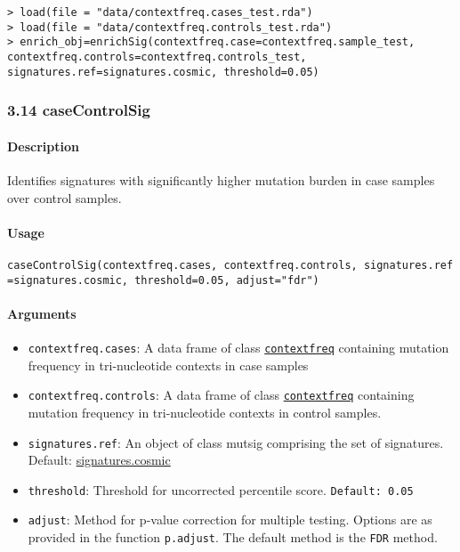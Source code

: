 \documentclass[]{article}
\providecommand{\tightlist}{%
  \setlength{\itemsep}{0pt}\setlength{\parskip}{0pt}}
\let\oldparagraph\paragraph
\renewcommand{\paragraph}[1]{\oldparagraph{#1}\mbox{}}
\begin{document}
\begin{verbatim}
> load(file = "data/contextfreq.cases_test.rda")
> load(file = "data/contextfreq.controls_test.rda")
> enrich_obj=enrichSig(contextfreq.case=contextfreq.sample_test, contextfreq.controls=contextfreq.controls_test, signatures.ref=signatures.cosmic, threshold=0.05)
\end{verbatim}

\subsubsection{3.14 caseControlSig}\label{casecontrolsig}

\paragraph{\texorpdfstring{\textbf{Description}}{Description}}\label{description-11}

Identifies signatures with significantly higher mutation burden in case
samples over control samples.

\paragraph{\texorpdfstring{\textbf{Usage}}{Usage}}\label{usage-13}

\texttt{caseControlSig(contextfreq.cases,\ contextfreq.controls,\ signatures.ref=signatures.cosmic,\ threshold=0.05,\ adjust="fdr")}

\paragraph{\texorpdfstring{\textbf{Arguments
}}{Arguments }}\label{arguments-12}

\begin{itemize}
\tightlist
\item
  \texttt{contextfreq.cases}: A data frame of class
  \protect\hyperlink{contextfreq}{\texttt{contextfreq}} containing
  mutation frequency in tri-nucleotide contexts in case samples
\item
  \texttt{contextfreq.controls}: A data frame of class
  \protect\hyperlink{contextfreq}{\texttt{contextfreq}} containing
  mutation frequency in tri-nucleotide contexts in control samples.
\item
  \texttt{signatures.ref}: An object of class mutsig comprising the set
  of signatures. Default:
  \href{https://cran.r-project.org/web/packages/deconstructSigs/deconstructSigs.pdf}{signatures.cosmic}
\item
  \texttt{threshold}: Threshold for uncorrected percentile score.
  \texttt{Default:\ 0.05}
\item
  \texttt{adjust}: Method for p-value correction for multiple testing.
  Options are as provided in the function \texttt{p.adjust}. The default
  method is the \texttt{FDR} method.
\end{itemize}
\end{document}
